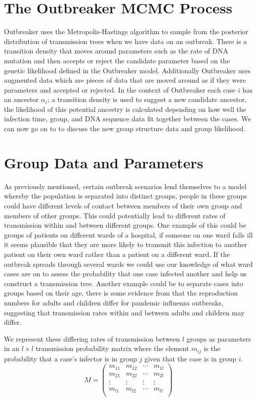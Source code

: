 \documentclass[11pt,a4paper]{report}
\begin{document}
\section{The Outbreaker MCMC Process}
Outbreaker uses the Metropolis-Hastings algorithm to sample from the posterior distribution of transmission trees when we have data on an outbreak. There is a transition density that moves around parameters such as the rate of DNA mutation and then accepts or reject the candidate parameter based on the genetic likelihood defined in the Outbreaker model. Additionally Outbreaker uses augmented data which are pieces of data that are moved around as if they were parameters and accepted or rejected. In the context of Outbreaker each case $i$ has an ancestor $\alpha_i$; a transition density is used to suggest a new candidate ancestor, the likelihood of this potential ancestry is calculated depending on how well the infection time, group, and DNA sequence data fit together between the cases. We can now go on to to discuss the new group structure data and group likelihood.



\section{Group Data and Parameters}
As previously mentioned, certain outbreak scenarios lend themselves to a model whereby the population is separated into distinct groups, people in these groups could have different levels of contact between members of their own group and members of other groups. This could potentially lead to different rates of transmission within and between different groups. One example of this could be groups of patients on different wards of a hospital, if someone on one ward falls ill it seems plausible that they are more likely to transmit this infection to another patient on their own ward rather than a patient on a different ward. If the outbreak spreads through several wards we could use our knowledge of what ward cases are on to assess the probability that one case infected another and help us construct a transmission tree. Another example could be to separate cases into groups based on their age, there is some evidence from \citet{Glass11} that the reproduction numbers for adults and children differ for pandemic influenza outbreaks, suggesting that transmission rates within and between adults and children may differ.


We represent these differing rates of transmission between $l$ groups as parameters in an $l \times l$ transmission probability matrix where the element $m_{ij}$ is the probability that a case's infector is in group $j$ given that the case is in group $i$.
\[ M = \left( \begin{array}{cccc}
m_{11} & m_{12} & \cdots & m_{1l} \\
m_{21} & m_{22} & \cdots & m_{2l} \\
\vdots & \vdots & \vdots & \vdots \\
m_{l1} & m_{l2} & \cdots & m_{ll} \\
\end{array} \right) \] 
\end{document}
